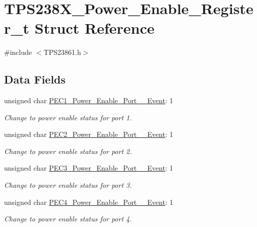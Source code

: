 \hypertarget{struct_t_p_s238_x___power___enable___register__t}{\section{T\-P\-S238\-X\-\_\-\-Power\-\_\-\-Enable\-\_\-\-Register\-\_\-t Struct Reference}
\label{struct_t_p_s238_x___power___enable___register__t}
}


{\ttfamily \#include $<$T\-P\-S23861.\-h$>$}

\subsection*{Data Fields}
\begin{DoxyCompactItemize}
\item 
unsigned char \hyperlink{struct_t_p_s238_x___power___enable___register__t_ae0d521373d262abb63f58a6d71f73a6b}{P\-E\-C1\-\_\-\-Power\-\_\-\-Enable\-\_\-\-Port\-\_\-\_\-\-Event}\-: 1
\begin{DoxyCompactList}\small\item\em Change to power enable status for port 1. \end{DoxyCompactList}\item 
unsigned char \hyperlink{struct_t_p_s238_x___power___enable___register__t_a389cb85ad5f0f7b1ad023f6ca956943d}{P\-E\-C2\-\_\-\-Power\-\_\-\-Enable\-\_\-\-Port\-\_\-\_\-\-Event}\-: 1
\begin{DoxyCompactList}\small\item\em Change to power enable status for port 2. \end{DoxyCompactList}\item 
unsigned char \hyperlink{struct_t_p_s238_x___power___enable___register__t_a3b9fd7ce28f7e21e18a9580b26f7d17a}{P\-E\-C3\-\_\-\-Power\-\_\-\-Enable\-\_\-\-Port\-\_\-\_\-\-Event}\-: 1
\begin{DoxyCompactList}\small\item\em Change to power enable status for port 3. \end{DoxyCompactList}\item 
unsigned char \hyperlink{struct_t_p_s238_x___power___enable___register__t_a242d83c5460b4ddd91109c54517f61a1}{P\-E\-C4\-\_\-\-Power\-\_\-\-Enable\-\_\-\-Port\-\_\-\_\-\-Event}\-: 1
\begin{DoxyCompactList}\small\item\em Change to power enable status for port 4. \end{DoxyCompactList}\item 

\end{DoxyCompactItemize}

